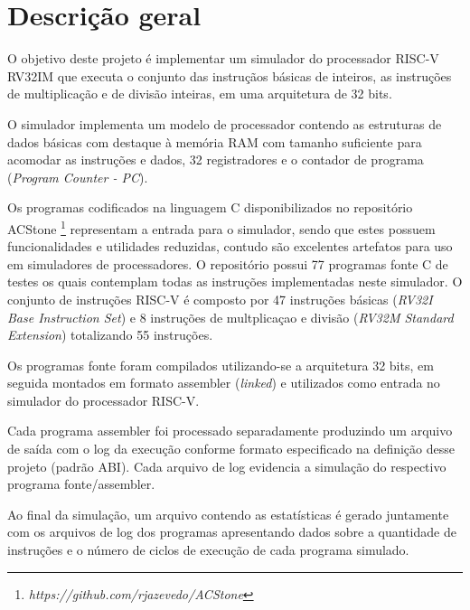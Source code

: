 
\section{Descrição geral}


O objetivo deste projeto é implementar um simulador do processador RISC-V RV32IM que executa o conjunto das instruçãos básicas de inteiros, as instruções de multiplicação e de divisão inteiras, em uma arquitetura de 32 bits.

O simulador implementa um modelo de processador contendo as estruturas de dados básicas com destaque à memória RAM com tamanho suficiente para acomodar as instruções e dados, 32 registradores e o contador de programa (\textit{Program Counter - PC}). 

Os programas codificados na linguagem C disponibilizados no repositório ACStone \footnote[1]{\textit{https://github.com/rjazevedo/ACStone}} representam a entrada para o simulador, sendo que estes possuem funcionalidades e utilidades reduzidas, contudo são excelentes artefatos para uso em simuladores de processadores. O repositório possui 77 programas fonte C de testes os quais contemplam todas as instruções implementadas neste simulador. O conjunto de instruções RISC-V é composto por 47 instruções básicas (\textit{RV32I Base Instruction Set}) e 8 instruções de multplicaçao e divisão (\textit{RV32M Standard Extension}) totalizando 55 instruções. 

Os programas fonte foram compilados utilizando-se a arquitetura 32 bits, em seguida montados em formato assembler (\textit{linked}) e utilizados como entrada no simulador do processador RISC-V.

Cada programa assembler foi processado separadamente produzindo um arquivo de saída com o log da execução conforme formato especificado na definição desse projeto (padrão ABI). Cada arquivo de log evidencia a simulação do respectivo programa fonte/assembler.

Ao final da simulação, um arquivo contendo as estatísticas é gerado juntamente com os arquivos de log dos programas apresentando dados sobre a quantidade de instruções e o número de ciclos de execução de cada programa simulado.